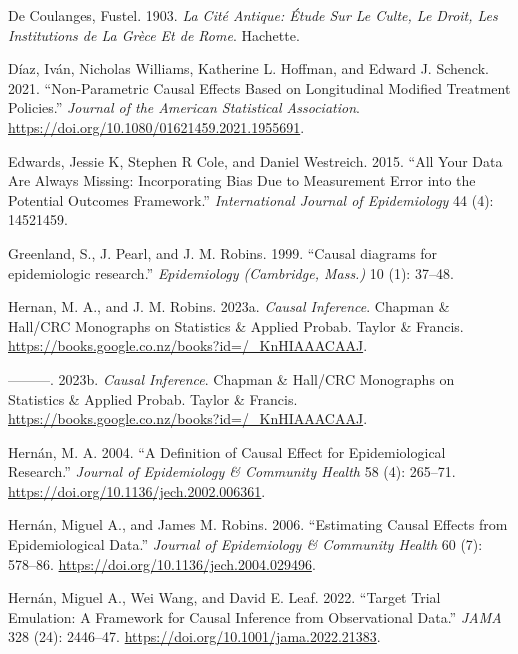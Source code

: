 \documentclass[
  singlecolumn]{report}
\newlength{\cslhangindent}
\newlength{\cslentryspacingunit} %
\newenvironment{CSLReferences}[2] %
 {%
  \setlength{\parindent}{0pt}
  \ifodd #1
  \let\oldpar\par
  \def\par{\hangindent=\cslhangindent\oldpar}
  \fi
  \setlength{\parskip}{#2\cslentryspacingunit}
 }%
 {}
\begin{document}
\begin{CSLReferences}{1}{0}
\leavevmode{}%
De Coulanges, Fustel. 1903. \emph{La Cité Antique: Étude Sur Le Culte,
Le Droit, Les Institutions de La Grèce Et de Rome}. Hachette.

\leavevmode{}%
Díaz, Iván, Nicholas Williams, Katherine L. Hoffman, and Edward J.
Schenck. 2021. {``Non-Parametric Causal Effects Based on Longitudinal
Modified Treatment Policies.''} \emph{Journal of the American
Statistical Association}.
\url{https://doi.org/10.1080/01621459.2021.1955691}.

\leavevmode{}%
Edwards, Jessie K, Stephen R Cole, and Daniel Westreich. 2015. {``All
Your Data Are Always Missing: Incorporating Bias Due to Measurement
Error into the Potential Outcomes Framework.''} \emph{International
Journal of Epidemiology} 44 (4): 14521459.

\leavevmode{}%
Greenland, S., J. Pearl, and J. M. Robins. 1999. {``Causal diagrams for
epidemiologic research.''} \emph{Epidemiology (Cambridge, Mass.)} 10
(1): 37--48.

\leavevmode{}%
Hernan, M. A., and J. M. Robins. 2023a. \emph{Causal Inference}. Chapman
\& Hall/CRC Monographs on Statistics \& Applied Probab. Taylor \&
Francis. \url{https://books.google.co.nz/books?id=/_KnHIAAACAAJ}.

\leavevmode{}%
---------. 2023b. \emph{Causal Inference}. Chapman \& Hall/CRC
Monographs on Statistics \& Applied Probab. Taylor \& Francis.
\url{https://books.google.co.nz/books?id=/_KnHIAAACAAJ}.

\leavevmode{}%
Hernán, M. A. 2004. {``A Definition of Causal Effect for Epidemiological
Research.''} \emph{Journal of Epidemiology \& Community Health} 58 (4):
265--71. \url{https://doi.org/10.1136/jech.2002.006361}.

\leavevmode{}%
Hernán, Miguel A., and James M. Robins. 2006. {``Estimating Causal
Effects from Epidemiological Data.''} \emph{Journal of Epidemiology \&
Community Health} 60 (7): 578--86.
\url{https://doi.org/10.1136/jech.2004.029496}.

\leavevmode{}%
Hernán, Miguel A., Wei Wang, and David E. Leaf. 2022. {``Target Trial
Emulation: A Framework for Causal Inference from Observational Data.''}
\emph{JAMA} 328 (24): 2446--47.
\url{https://doi.org/10.1001/jama.2022.21383}.


\end{CSLReferences}
\end{document}
